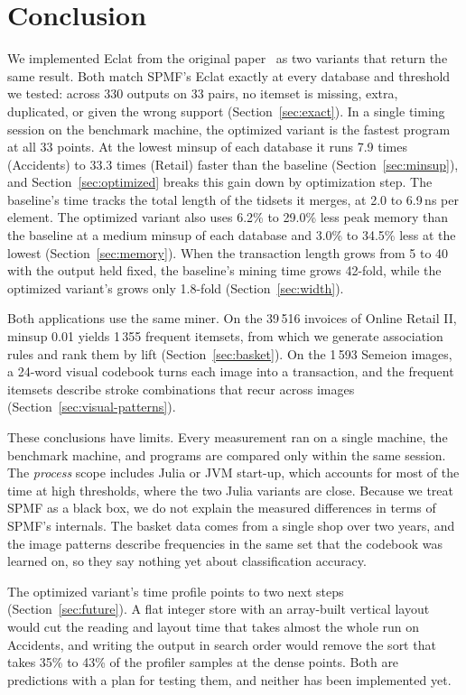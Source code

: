 \section{Conclusion}
We implemented Eclat from the original paper~\cite{zaki2000} as two variants that return
the same result. Both match SPMF's Eclat exactly at every database and threshold we
tested: across 330 outputs on 33 pairs, no itemset is missing, extra, duplicated, or
given the wrong support (Section~\ref{sec:exact}). In a single timing session on the
benchmark machine, the optimized variant is the fastest program at all 33 points. At the
lowest minsup of each database it runs 7.9 times (Accidents) to 33.3 times (Retail)
faster than the baseline (Section~\ref{sec:minsup}), and Section~\ref{sec:optimized}
breaks this gain down by optimization step. The baseline's time tracks the total length of
the tidsets it merges, at 2.0 to 6.9\,ns per element. The optimized variant also uses
6.2\% to 29.0\% less peak memory than the baseline at a medium minsup of each database and
3.0\% to 34.5\% less at the lowest (Section~\ref{sec:memory}). When the transaction length grows from 5 to 40 with
the output held fixed, the baseline's mining time grows 42-fold, while the optimized
variant's grows only 1.8-fold (Section~\ref{sec:width}).

Both applications use the same miner. On the 39\,516 invoices of Online Retail II, minsup
0.01 yields 1\,355 frequent itemsets, from which we generate association rules and rank
them by lift (Section~\ref{sec:basket}). On the 1\,593 Semeion images, a 24-word visual
codebook turns each image into a transaction, and the frequent itemsets describe stroke
combinations that recur across images (Section~\ref{sec:visual-patterns}).

These conclusions have limits. Every measurement ran on a single machine, the benchmark
machine, and programs are compared only within the same session. The \emph{process}
scope includes Julia or JVM start-up, which accounts for most of the time at high
thresholds, where the two Julia variants are close. Because we treat SPMF as a black box,
we do not explain the measured differences in terms of SPMF's internals. The basket data
comes from a single shop over two years, and the image patterns describe frequencies in
the same set that the codebook was learned on, so they say nothing yet about
classification accuracy.

The optimized variant's time profile points to two next steps (Section~\ref{sec:future}).
A flat integer store with an array-built vertical layout would cut the reading and layout
time that takes almost the whole run on Accidents, and writing the output in search order
would remove the sort that takes 35\% to 43\% of the profiler samples at the dense points.
Both are predictions with a plan for testing them, and neither has been implemented yet.
